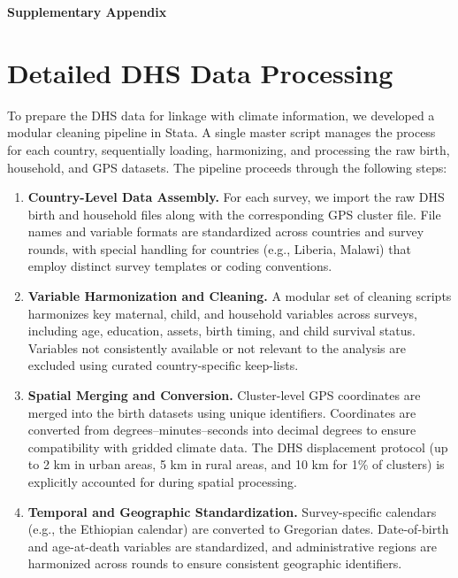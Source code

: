 \documentclass[a4paper]{article}
\begin{document}
\pagebreak
\begin{appendix}
\clearpage
\begin{center}
\huge{\textbf{Supplementary Appendix}}
\end{center}
\appendix





\section{Detailed DHS Data Processing} \label{app:dhs}

To prepare the DHS data for linkage with climate information, we developed a modular cleaning pipeline in Stata. A single master script manages the process for each country, sequentially loading, harmonizing, and processing the raw birth, household, and GPS datasets. The pipeline proceeds through the following steps:  

\begin{enumerate}
    \item \textbf{Country-Level Data Assembly.}  
    For each survey, we import the raw DHS birth and household files along with the corresponding GPS cluster file. File names and variable formats are standardized across countries and survey rounds, with special handling for countries (e.g., Liberia, Malawi) that employ distinct survey templates or coding conventions.  

    \item \textbf{Variable Harmonization and Cleaning.}  
    A modular set of cleaning scripts harmonizes key maternal, child, and household variables across surveys, including age, education, assets, birth timing, and child survival status. Variables not consistently available or not relevant to the analysis are excluded using curated country-specific keep-lists.  

    \item \textbf{Spatial Merging and Conversion.}  
    Cluster-level GPS coordinates are merged into the birth datasets using unique identifiers. Coordinates are converted from degrees--minutes--seconds into decimal degrees to ensure compatibility with gridded climate data. The DHS displacement protocol (up to 2 km in urban areas, 5 km in rural areas, and 10 km for 1\% of clusters) is explicitly accounted for during spatial processing.  

    \item \textbf{Temporal and Geographic Standardization.}  
    Survey-specific calendars (e.g., the Ethiopian calendar) are converted to Gregorian dates. Date-of-birth and age-at-death variables are standardized, and administrative regions are harmonized across rounds to ensure consistent geographic identifiers.  


\end{enumerate}
\end{appendix}
\end{document}
